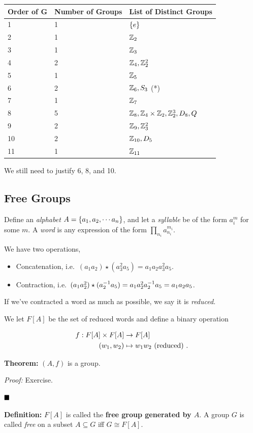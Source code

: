 \begin{longtable}[]{@{}lll@{}}
\toprule
Order of G & Number of Groups & List of Distinct Groups\tabularnewline
\midrule
\endhead
1 & 1 & \(\left\{{e}\right\}\)\tabularnewline
2 & 1 & \({\mathbb{Z}}_2\)\tabularnewline
3 & 1 & \({\mathbb{Z}}_3\)\tabularnewline
4 & 2 & \({\mathbb{Z}}_4, {\mathbb{Z}}_2^2\)\tabularnewline
5 & 1 & \({\mathbb{Z}}_5\)\tabularnewline
6 & 2 & \({\mathbb{Z}}_6, S_3\) (*)\tabularnewline
7 & 1 & \({\mathbb{Z}}_7\)\tabularnewline
8 & 5 & \({\mathbb{Z}}_8,{\mathbb{Z}}_4 \times {\mathbb{Z}}_2, {\mathbb{Z}}_2^3, D_8,Q\)\tabularnewline
9 & 2 & \({\mathbb{Z}}_9, {\mathbb{Z}}_3^2\)\tabularnewline
10 & 2 & \({\mathbb{Z}}_{10}, D_5\)\tabularnewline
11 & 1 & \({\mathbb{Z}}_{11}\)\tabularnewline
\bottomrule
\end{longtable}

We still need to justify 6, 8, and 10.

\hypertarget{free-groups}{%
\subsection{Free Groups}\label{free-groups}}

Define an \emph{alphabet} \(A = \left\{{a_1, a_2, \cdots a_n}\right\}\), and let
a \emph{syllable} be of the form \(a_i^m\) for some \(m\). A \emph{word}
is any expression of the form \(\prod_{n_i} a_{n_i}^{m_i}\).

We have two operations,

\begin{itemize}
\item
  Concatenation,
  i.e.~\((a_1 a_2) \star (a_3^2 a_5) = a_1 a_2 a_3^2 a_5\).
\item
  Contraction,
  i.e.~\((a_1 a_2^2) \star (a_2^{-1} a_5) = a_1 a_2^2 a_2^{-1} a_5 = a_1 a_2 a_5\).
\end{itemize}

If we've contracted a word as much as possible, we say it is
\emph{reduced}.

We let \(F[A]\) be the set of reduced words and define a binary
operation

\begin{align*}
f: F[A] \times F[A] &\to F[A] \\
(w_1, w_2) &\mapsto w_1 w_2 \text{ (reduced) }
.\end{align*}

\textbf{Theorem:} \((A, f)\) is a group.

\emph{Proof:} Exercise.

\(\qed\)

\textbf{Definition:} \(F[A]\) is called the \textbf{free group generated
by \(A\)}. A group \(G\) is called \emph{free} on a subset
\(A \subseteq G\) iff \(G \cong F[A]\).

